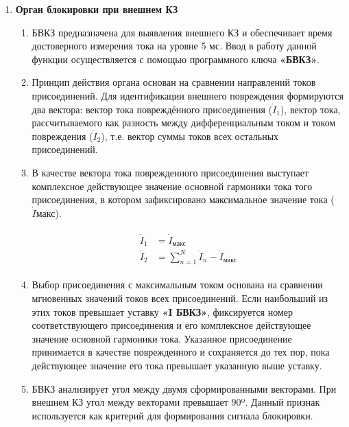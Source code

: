\begin{enumerate}
\begin{enumerate}
\end{enumerate}


\item \textbf{Орган блокировки при внешнем КЗ}

\begin{enumerate}

\item
БВКЗ предназначена для выявления внешнего КЗ и обеспечивает время достоверного измерения тока на уровне 5 мс. Ввод в работу данной функции осуществляется с помощью программного ключа \textbf{«БВКЗ»}.

\item
Принцип действия органа основан на сравнении направлений токов присоединений. Для идентификации внешнего повреждения формируются два вектора: вектор тока повреждённого присоединения ($ \dot{I}_1 $), вектор тока, рассчитываемого как разность между дифференциальным током и током повреждения ($ \dot{I}_2 $), т.е. вектор суммы токов всех остальных присоединений.

\item
В качестве вектора тока поврежденного присоединения выступает комплексное действующее значение основной гармоники тока того присоединения, в котором зафиксировано максимальное значение тока ($ \dot{I} \textit{макс} $).

\begin{align}
\begin{split}
\dot{I}_1&=\dot{I}_\textit{макс}\\
\dot{I}_2&=\sum_{n=1}^N \dot{I}_{n} - \dot{I}_\textit{макс}
\end{split}
\end{align}

\item
Выбор присоединения с максимальным током основана на сравнении мгновенных значений токов всех присоединений. Если наибольший из этих токов превышает уставку \textbf{«I БВКЗ»}, фиксируется номер соответствующего присоединения и его комплексное действующее значение основной гармоники тока. Указанное присоединение принимается в качестве поврежденного и сохраняется до тех пор, пока действующее значение его тока превышает указанную выше уставку.

\item
БВКЗ анализирует угол между двумя сформированными векторами. При внешнем КЗ угол между векторами превышает 90º. Данный признак используется как критерий для формирования сигнала блокировки.


\end{enumerate}
\end{enumerate}
